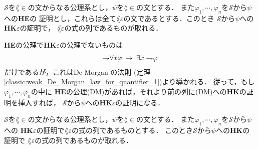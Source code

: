 	\begin{screen}
		\begin{metathm}
		\label{metathm:Henkin_expansion_1}
			$\mathscr{S}$を$\lang{\in}$の文からなる公理系とし，$\psi$を$\lang{\in}$の文とする．
			また$\varphi_{1},\cdots,\varphi_{n}$を$\mathscr{S}$から$\psi$への{\bf HE}の
			証明とし，これらは全て$\lang{\varepsilon}$の文であるとする．このとき
			$\mathscr{S}$から$\psi$への{\bf HK$\varepsilon$}の証明で，
			$\lang{\varepsilon}$の式の列であるものが取れる．
		\end{metathm}
	\end{screen}
	
	\begin{metaprf}
		{\bf HE}の公理で{\bf HK$\varepsilon$}の公理でないものは
		\begin{align}
			\rightharpoondown\hspace{-0.25em} \forall x \varphi \hspace{0.25em}\rightarrow\hspace{0.25em} \exists x \rightharpoondown\hspace{-0.25em} \varphi
		\end{align}
		だけであるが，これはDe Morgan の法則
		(定理\ref{classic:weak_De_Morgan_law_for_quantifier_1})より導かれる．
		従って，もし$\varphi_{1},\cdots,\varphi_{n}$の中に
		{\bf HE}の公理(DM)があれば，それより前の列に(DM)への{\bf HK}の証明を挿入すれば，
		$\mathscr{S}$から$\psi$への{\bf HK$\varepsilon$}の証明になる．
		\QED
	\end{metaprf}
	
	\begin{screen}
		\begin{metathm}
		\label{metathm:Henkin_expansion_2}
			$\mathscr{S}$を$\lang{\in}$の文からなる公理系とし，$\psi$を$\lang{\in}$の文とする．
			また$\varphi_{1},\cdots,\varphi_{n}$を$\mathscr{S}$から$\psi$への
			{\bf HK$\varepsilon$}の証明で$\lang{\varepsilon}$の式の列であるものとする．
			このとき$\mathscr{S}$から$\psi$への{\bf HK}の証明で
			$\lang{\varepsilon}$の式の列であるものが取れる．
		\end{metathm}
	\end{screen}
	
